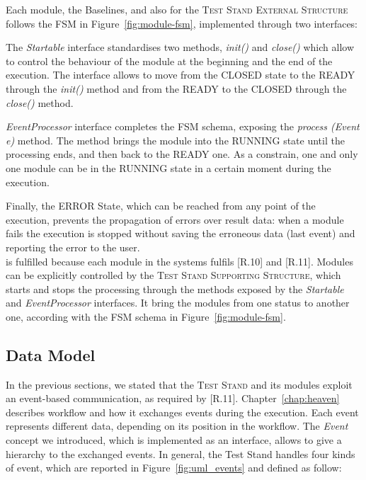 Each \name module, the Baselines, and also for the \textsc{Test Stand External Structure} follows the FSM in Figure~\ref{fig:module-fsm}, implemented through two interfaces: 

The \textit{Startable} interface standardises two methods, \textit{init()} and \textit{close()} which allow to control the behaviour of the module at the beginning and the end of the execution. The interface allows to move from the CLOSED state to the READY through the \textit{init()} method and from the READY to the CLOSED through the \textit{close()} method. 

\textit{EventProcessor} interface completes the FSM schema, exposing the \textit{process (Event e)} method. The method brings the module into the RUNNING state until the processing ends, and then back to the READY one. As a constrain, one and only one module can be in the RUNNING state in a certain moment during the execution.

Finally, the ERROR State, which can be reached from any point of the execution, prevents the propagation of errors over result data: when a module fails the execution is stopped without saving the erroneous data (last event) and reporting the error to the user.\\


\noindent [R.4] is fulfilled because each module in the systems fulfils [R.10] and [R.11]. \name Modules can be explicitly controlled by the \textsc{Test Stand Supporting Structure}, which starts and stops the processing through the methods exposed by the \textit{Startable} and \textit{EventProcessor} interfaces. It bring the modules from one status to another one, according with the FSM schema in Figure~\ref{fig:module-fsm}.

\pagebreak

\subsection{Data Model}\label{sec:data-impl}

In the previous sections, we stated that the \textsc{Test Stand} and its modules exploit an event-based communication, as required by [R.11]. Chapter~\ref{chap:heaven} describes \name workflow and how it exchanges events during the execution. Each event represents different data, depending on its position in the workflow. The \textit{Event} concept we introduced, which is implemented as an interface, allows to give a hierarchy to the exchanged events. In general, the Test Stand handles four kinds of event, which are reported in Figure~\ref{fig:uml_events} and defined as follow:

